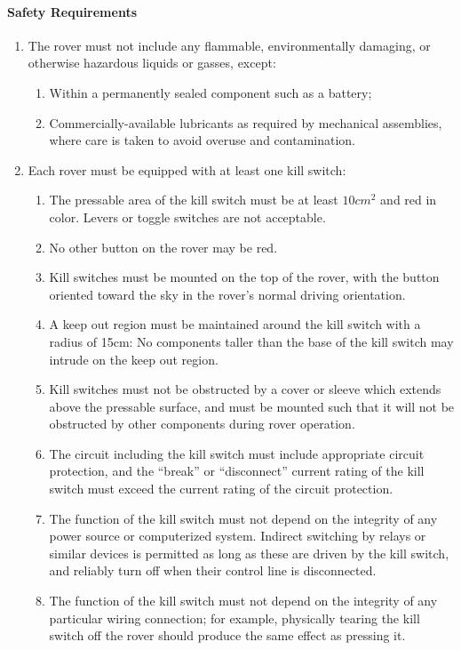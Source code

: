 \paragraph{Safety Requirements}

\begin{enumerate}
    \item The rover must not include any flammable, environmentally damaging, or otherwise hazardous liquids or gasses, except:
    \begin{enumerate}
        \item Within a permanently sealed component such as a battery;
        \item Commercially-available lubricants as required by mechanical assemblies, where care is taken to avoid overuse and contamination.
    \end{enumerate}
    \item Each rover must be equipped with at least one kill switch:
    \begin{enumerate}
        \item The pressable area of the kill switch must be at least $10 cm^2$ and red in color. Levers or toggle switches are not acceptable.
        \item No other button on the rover may be red.
        \item Kill switches must be mounted on the top of the rover, with the button oriented toward the sky in the rover’s normal driving orientation.
        \item A keep out region must be maintained around the kill switch with a radius of 15cm: No components taller than the base of the kill switch may intrude on the keep out region.
        \item Kill switches must not be obstructed by a cover or sleeve which extends above the pressable surface, and must be mounted such that it will not be obstructed by other components during rover operation.
        \item The circuit including the kill switch must include appropriate circuit protection, and the “break” or “disconnect” current rating of the kill switch must exceed the current rating of the circuit protection.
        \item The function of the kill switch must not depend on the integrity of any power source or computerized system. Indirect switching by relays or similar devices is permitted as long as these are driven by the kill switch, and reliably turn off when their control line is disconnected.
        \item The function of the kill switch must not depend on the integrity of any particular wiring connection; for example, physically tearing the kill switch off the rover should produce the same effect as pressing it.

\end{enumerate}
\end{enumerate}
